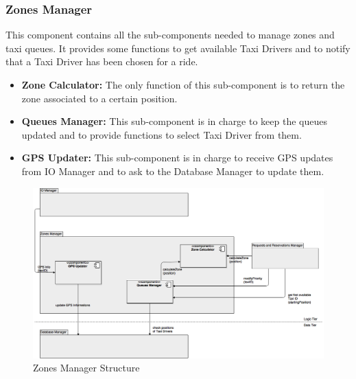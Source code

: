 \documentclass[../../../../../../../dd.tex]{subfiles}
\begin{document}
	\subsubsection{Zones Manager}
		This component contains all the sub-components needed to manage zones and taxi queues.
		It provides some functions to get available Taxi Drivers and to notify that a Taxi Driver has been chosen for a ride.
		\begin{itemize}
			\item \textbf{Zone Calculator:} The only function of this sub-component is to return the zone associated to a certain position.

			\item \textbf{Queues Manager:} This sub-component is in charge to keep the queues updated and to provide functions to select Taxi Driver from them.

			\item \textbf{GPS Updater:} This sub-component is in charge to receive GPS updates from IO Manager and to ask to the Database Manager to update them.
		\end{itemize}

		\begin{figure}[H]
				\centering
				\includegraphics[width=\textwidth, scale=0.5]{../images/ZonesManager.png}
			\caption{Zones Manager Structure}\label{fig:ZonesManager}
		\end{figure}
		
\end{document}
